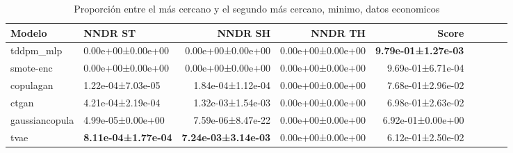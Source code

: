 \begin{table}[H]
\centering
\fontsize{10}{14}\selectfont
\caption{Proporción entre el más cercano y el segundo más cercano, minimo, datos economicos}
\label{table-dcr-economicos-a}
\begin{tabular}{|l|l|r|r|r|r|r|r|r|}
\hline
\rowcolor[gray]{0.8}
Modelo & NNDR ST & NNDR SH & NNDR TH & \textbf{Score} \\
\hline tddpm\_mlp & \cellcolor[rgb]{0.9, 0.54, 0.52} 0.00e+00±0.00e+00 & \cellcolor[rgb]{0.9, 0.54, 0.52} 0.00e+00±0.00e+00 & 0.00e+00±0.00e+00 & \bfseries 9.79e-01±1.27e-03 \\
\hline smote-enc & \cellcolor[rgb]{0.9, 0.54, 0.52} 0.00e+00±0.00e+00 & \cellcolor[rgb]{0.9, 0.54, 0.52} 0.00e+00±0.00e+00 & 0.00e+00±0.00e+00 & 9.69e-01±6.71e-04 \\
\hline copulagan & 1.22e-04±7.03e-05 & 1.84e-04±1.12e-04 & 0.00e+00±0.00e+00 & 7.68e-01±2.96e-02 \\
\hline ctgan & 4.21e-04±2.19e-04 & 1.32e-03±1.54e-03 & 0.00e+00±0.00e+00 & 6.98e-01±2.63e-02 \\
\hline gaussiancopula & 4.99e-05±0.00e+00 & 7.59e-06±8.47e-22 & 0.00e+00±0.00e+00 & 6.92e-01±0.00e+00 \\
\hline tvae & \bfseries 8.11e-04±1.77e-04 & \bfseries 7.24e-03±3.14e-03 & 0.00e+00±0.00e+00 & \cellcolor[rgb]{0.9, 0.54, 0.52} 6.12e-01±2.50e-02 \\
\hline
\end{tabular}
\end{table}
